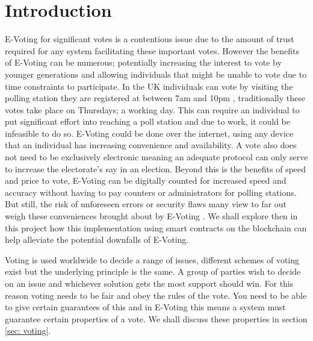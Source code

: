 \documentclass{entcs}
\begin{document}
\section{Introduction}
E-Voting for significant votes is a contentious issue due to the amount of trust required for any system facilitating these important votes. However the benefits of E-Voting can be numerous; potentially increasing the interest to vote by younger generations and allowing individuals that might be unable to vote due to time constraints to participate. In the UK individuals can vote by visiting the polling station they are registered at between 7am and 10pm \cite{pollStations}, traditionally these votes take place on Thursdays; a working day. This can require an individual to put significant effort into reaching a poll station and due to work, it could be infeasible to do so. E-Voting could be done over the internet, using any device that an individual has increasing convenience and availability. A vote also does not need to be exclusively electronic meaning an adequate protocol can only serve to increase the electorate's say in an election. Beyond this is the benefits of speed and price to vote, E-Voting can be digitally counted for increased speed and accuracy without having to pay counters or administrators for polling stations. But still, the risk of unforeseen errors or security flaws many view to far out weigh these conveniences brought about by E-Voting \cite{lauer2004risk}. We shall explore then in this project how this implementation using smart contracts on the blockchain can help alleviate the potential downfalls of E-Voting.

Voting is used worldwide to decide a range of issues, different schemes of voting exist but the underlying principle is the same. A group of parties wish to decide on an issue and whichever solution gets the most support should win. For this reason voting needs to be fair and obey the rules of the vote. You need to be able to give certain guarantees of this and in E-Voting this means a system must guarantee certain properties of a vote. We shall discuss these properties in section \ref{sec: voting}.
\end{document}
